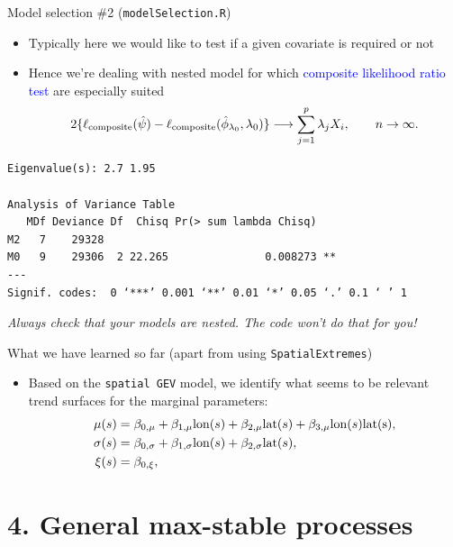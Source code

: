 \documentclass[mode=present,style=simple,paper=screen]{powerdot}
\theoremstyle{plain}%
\theoremstyle{definition}
\theoremstyle{remark}
\newcommand{\advice}[1]{\HandPencilLeft{} \emph{#1}}
\begin{document}
\begin{slide}[toc=Model selection \#2,method=direct]{Model selection \#2
    (\texttt{modelSelection.R}) \citep{Chandler2007,Kent1982}}
  \begin{itemize}
  \item Typically here we would like to test if a given covariate is
    required or not
  \item Hence we're dealing with nested model for which
    \textcolor{blue}{composite likelihood ratio test} are especially
    suited
    \begin{equation*}
      2 \{\ell_{\rm composite}(\hat \psi) - \ell_{\rm composite}(\hat
      \phi_{\lambda_0}, \lambda_0)\} \longrightarrow \sum_{j=1}^p
      \lambda_j X_i, \qquad n \to \infty.
    \end{equation*}
  \end{itemize}
{\tiny
\begin{verbatim}
Eigenvalue(s): 2.7 1.95

Analysis of Variance Table
   MDf Deviance Df  Chisq Pr(> sum lambda Chisq)
M2   7    29328
M0   9    29306  2 22.265               0.008273 **
---
Signif. codes:  0 ‘***’ 0.001 ‘**’ 0.01 ‘*’ 0.05 ‘.’ 0.1 ‘ ’ 1
\end{verbatim}
}
\advice{Always check that your models are nested. The code won't do
  that for you!}
\end{slide}

\begin{slide}[toc=Debrief \#3]{What we have learned so far (apart from
    using \texttt{SpatialExtremes})}
  \begin{itemize}
  \item Based on the \texttt{spatial GEV} model, we identify what
    seems to be relevant trend surfaces for the marginal parameters:
    \begin{align*}
      \mu(s) &= \beta_{0,\mu} + \beta_{1, \mu} {\rm lon}(s) + \beta_{2,
        \mu} {\rm lat}(s) + \beta_{3,\mu} {\rm lon}(s) {\rm lat(s)},\\
      \sigma(s) &= \beta_{0,\sigma} + \beta_{1, \sigma} {\rm lon}(s) + \beta_{2,
        \sigma} {\rm lat}(s),\\
      \xi(s) &= \beta_{0,\xi},
    \end{align*}
  \end{itemize}
\end{slide}

\section{4. General max-stable processes}
\end{document}
